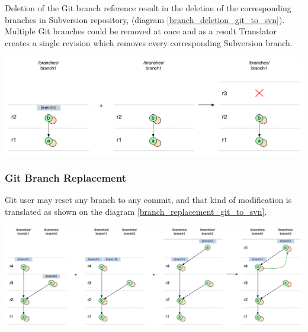 Deletion of the Git branch reference result in the deletion of the corresponding branches in Subversion repository, 
(diagram \ref{branch_deletion_git_to_svn}). Multiple Git branches could be removed at once and as a result Translator 
creates a single revision which removes every corresponding Subversion branch.
\begin{center}
\includegraphics[width=\textwidth]{img/diagrams/branch_deletion_git_to_svn.pdf}%
\label{branch_deletion_git_to_svn}%
\end{center}

\subsubsection{Git Branch Replacement}
Git user may reset any branch to any commit, and that kind of modification is translated as shown on the diagram \ref{branch_replacement_git_to_svn}.
\begin{center}
\includegraphics[width=\textwidth]{img/diagrams/branch_replacement_git_to_svn.pdf}%
\label{branch_replacement_git_to_svn}%
\end{center}
